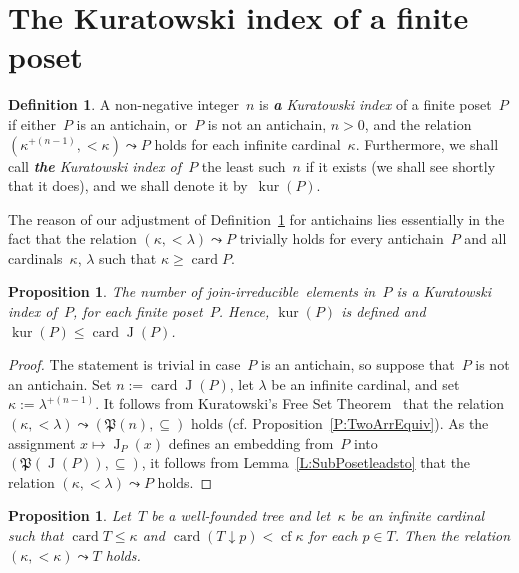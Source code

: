 \documentclass[psamsfonts,reqno]{amsart}
\theoremstyle{plain}
\newtheorem{proposition}[lemma]{Proposition}
\theoremstyle{definition}
\newtheorem{definition}[lemma]{Definition}
\theoremstyle{remark}
\numberwithin{equation}{section}
\numberwithin{figure}{section}
\newcommand{\gk}{\kappa}
\newcommand{\gl}{\lambda}
\DeclareMathOperator{\kur}{kur}
\DeclareMathOperator{\card}{card}
\DeclareMathOperator{\cf}{cf}
\DeclareMathOperator{\J}{J}
\newcommand{\Pow}{\mathfrak{P}}
\newcommand{\jirr}{join-ir\-re\-duc\-i\-ble}
\newcommand{\dnw}{\mathbin{\downarrow}}
\begin{document}
\section[Kuratowski index]{The Kuratowski index of a finite poset}\label{S:KuratInd}

\begin{definition}\label{D:KurInd}
A non-negative integer~$n$ is \emph{\textbf{a} Kuratowski index} of a finite poset~$P$ if either~$P$ is an antichain, or~$P$ is not an antichain, $n>0$, and the relation $(\gk^{+(n-1)},{<}\gk)\leadsto P$ holds for each infinite cardinal~$\gk$. Furthermore, we shall call \emph{\textbf{the} Kuratowski index of~$P$} the least such~$n$ if it exists (we shall see shortly that it does), and we shall denote it by~$\kur(P)$.
\end{definition}

The reason of our adjustment of Definition~\ref{D:KurInd} for antichains lies essentially in the fact that the relation $(\gk,{<}\gl)\leadsto P$ trivially holds for every antichain~$P$ and all cardinals~$\gk$, $\gl$ such that $\gk\geq\card P$.

\begin{proposition}\label{P:Existskur(P)}
The number of \jirr\ elements in~$P$ is a Kuratowski index of~$P$, for each finite poset~$P$. Hence, $\kur(P)$ is defined and $\kur(P)\leq\card\J(P)$.
\end{proposition}

\begin{proof}
The statement is trivial in case~$P$ is an antichain, so suppose that~$P$ is not an antichain. Set $n:=\card\J(P)$, let $\gl$ be an infinite cardinal, and set $\gk:=\gl^{+(n-1)}$. It follows from Kuratowski's Free Set Theorem~\cite{Kura51} that the relation $(\gk,{<}\gl)\leadsto(\Pow(n),\subseteq)$ holds (cf. Proposition~\ref{P:TwoArrEquiv}). As the assignment $x\mapsto\J_P(x)$ defines an embedding from~$P$ into $(\Pow(\J(P)),\subseteq)$, it follows from Lemma~\ref{L:SubPosetleadsto} that the relation $(\gk,{<}\gl)\leadsto P$ holds.
\end{proof}

\begin{proposition}\label{P:KuratTree}
Let~$T$ be a well-founded tree and let~$\gk$ be an infinite cardinal such that $\card T\leq\gk$ and $\card(T\dnw p)<\cf\gk$ for each $p\in T$. Then the relation $(\gk,{<}\gk)\leadsto T$ holds.
\end{proposition}
\end{document}

